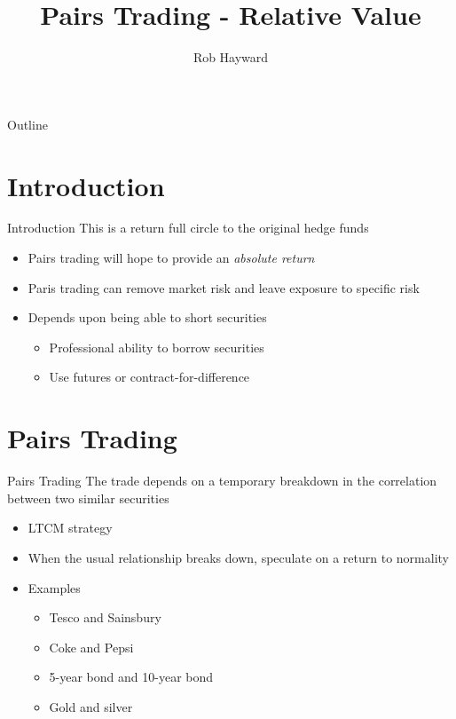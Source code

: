 \documentclass[14pt,xcolor=pdftex,dvipsnames,table]{beamer}\usepackage[]{graphicx}\usepackage[]{color}
\title{Pairs Trading - Relative Value}
\author{Rob Hayward}
\begin{document}
\begin{frame}
\titlepage
\end{frame}

\begin{frame}{Outline}
\tableofcontents
\end{frame}

\section{Introduction}
\begin{frame}{Introduction}
This is a return full circle to the original hedge funds
\begin{itemize}[<+-| alert@+>]
\item Pairs trading will hope to provide an \emph{absolute return}
\item Paris trading can remove market risk and leave exposure to specific risk
\item Depends upon being able to short securities
\begin{itemize}
\item Professional ability to borrow securities
\item Use futures or contract-for-difference
\end{itemize}
\end{itemize}
\end{frame}

\section{Pairs Trading}
\begin{frame}{Pairs Trading}
The trade depends on a temporary breakdown in the correlation between two similar securities
\begin{itemize}[<+-| alert@+>]
\item LTCM strategy
\item When the usual relationship breaks down, speculate on a return to normality
\item Examples
\begin{itemize}
\item Tesco and Sainsbury
\item Coke and Pepsi
\item 5-year bond and 10-year bond
\item Gold and silver
\end{itemize}
\end{itemize}
\end{frame}
\end{document}
